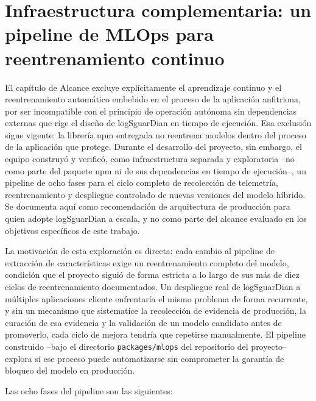 \section{Infraestructura complementaria: un pipeline de MLOps para reentrenamiento continuo}\label{sec:recomendacion-mlops}

El capítulo de Alcance excluye explícitamente el aprendizaje continuo y el reentrenamiento automático embebido en el proceso de la aplicación anfitriona, por ser incompatible con el principio de operación autónoma sin dependencias externas que rige el diseño de logSguarDian en tiempo de ejecución. Esa exclusión sigue vigente: la librería npm entregada no reentrena modelos dentro del proceso de la aplicación que protege. Durante el desarrollo del proyecto, sin embargo, el equipo construyó y verificó, como infraestructura separada y exploratoria --no como parte del paquete npm ni de sus dependencias en tiempo de ejecución--, un pipeline de ocho fases para el ciclo completo de recolección de telemetría, reentrenamiento y despliegue controlado de nuevas versiones del modelo híbrido. Se documenta aquí como recomendación de arquitectura de producción para quien adopte logSguarDian a escala, y no como parte del alcance evaluado en los objetivos específicos de este trabajo.

La motivación de esta exploración es directa: cada cambio al pipeline de extracción de características exige un reentrenamiento completo del modelo, condición que el proyecto siguió de forma estricta a lo largo de sus más de diez ciclos de reentrenamiento documentados. Un despliegue real de logSguarDian a múltiples aplicaciones cliente enfrentaría el mismo problema de forma recurrente, y sin un mecanismo que sistematice la recolección de evidencia de producción, la curación de esa evidencia y la validación de un modelo candidato antes de promoverlo, cada ciclo de mejora tendría que repetirse manualmente. El pipeline construido --bajo el directorio \texttt{packages/mlops} del repositorio del proyecto-- explora si ese proceso puede automatizarse sin comprometer la garantía de bloqueo del modelo en producción.

Las ocho fases del pipeline son las siguientes:

